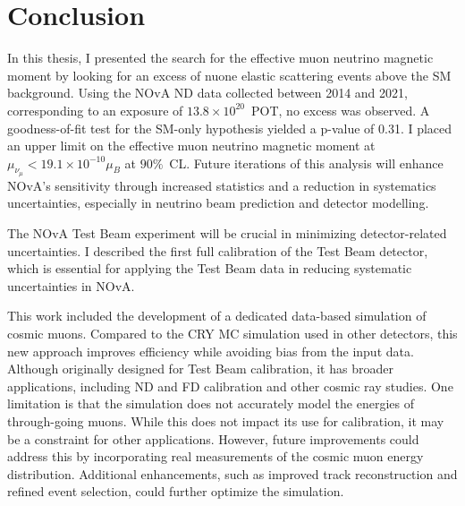 \chapter{Conclusion}\label{sec:Conclusion}

In this thesis, I presented the search for the effective muon neutrino magnetic moment by looking for an excess of \gls{nuone} elastic scattering events above the \gls{SM} background. Using the \gls{NOvA} \gls{ND} data collected between 2014 and 2021, corresponding to an exposure of $13.8\times10^{20}$~\gls{POT}, no excess was observed. A goodness-of-fit test for the \gls{SM}-only hypothesis yielded a p-value of 0.31. I placed an upper limit on the effective muon neutrino magnetic moment at $\mu_{\nu_\mu}<19.1\times 10^{-10}\mu_B$ at $90\%$~\gls{CL}. Future iterations of this analysis will enhance \gls{NOvA}'s sensitivity through increased statistics and a reduction in systematics uncertainties, especially in neutrino beam prediction and detector modelling.

The NOvA Test Beam experiment will be crucial in minimizing detector-related uncertainties. I described the first full calibration of the Test Beam detector, which is essential for applying the Test Beam data in reducing systematic uncertainties in \gls{NOvA}. 


This work included the development of a dedicated data-based simulation of cosmic muons. Compared to the \gls{CRY} \gls{MC} simulation used in other detectors, this new approach improves efficiency while avoiding bias from the input data. Although originally designed for Test Beam calibration, it has broader applications, including \gls{ND} and \gls{FD}  calibration and other cosmic ray studies. One limitation is that the simulation does not accurately model the energies of through-going muons. While this does not impact its use for calibration, it may be a constraint for other applications. However, future improvements could address this by incorporating real measurements of the cosmic muon energy distribution. Additional enhancements, such as improved track reconstruction and refined event selection, could further optimize the simulation.